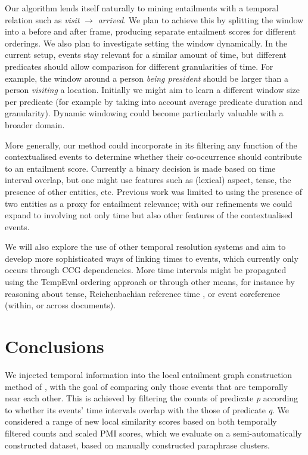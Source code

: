 \documentclass[11pt]{article}
\begin{document}
Our algorithm lends itself naturally to mining entailments with a temporal relation such as \textit{visit} $\rightarrow$ \textit{arrived}. We plan to achieve this by splitting the window into a before and after frame, producing separate entailment scores for different orderings. We also plan to investigate setting the window dynamically. In the current setup, events stay relevant for a similar amount of time, but different predicates should allow comparison for different granularities of time. For example, the window around a person \textit{being president} should be larger than a person \textit{visiting} a location. Initially we might aim to learn a different window size per predicate (for example by taking into account average predicate duration and granularity). Dynamic windowing could become particularly valuable with a broader domain.

More generally, our method could incorporate in its filtering any function of the contextualised events to determine whether their co-occurrence should contribute to an entailment score. Currently a binary decision is made based on time interval overlap, but one might use features such as (lexical) aspect, tense, the presence of other entities, etc. Previous work was limited to using the presence of two entities as a proxy for entailment relevance; with our refinements we could expand to involving not only time but also other features of the contextualised events.

We will also explore the use of other temporal resolution systems and aim to develop more sophisticated ways of linking times to events, which currently only occurs through CCG dependencies. More time intervals might be propagated using the TempEval \cite{uzzaman2013semeval} ordering approach or through other means, for instance by reasoning about tense, Reichenbachian reference time \cite{reichenbach1947tenses}, or event coreference (within, or across documents). 


\section{Conclusions}
\label{sec:conclusions}
We injected temporal information into the local entailment graph construction method of , with the goal of comparing only those events that are temporally near each other. This is achieved by filtering the counts of predicate \textit{p} according to whether its events' time intervals overlap with the those of predicate \textit{q}. We considered a range of new local similarity scores based on both temporally filtered counts and scaled PMI scores, which we evaluate on a semi-automatically constructed dataset, based on manually constructed paraphrase clusters. 
\end{document}

